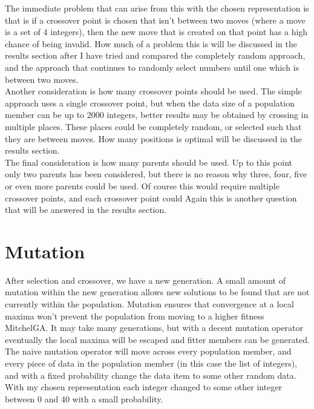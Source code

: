 \documentclass[]{report}
\begin{document}
The immediate problem that can arise from this with the chosen representation is that is if a crossover point is chosen that isn't between two moves (where a move is a set of 4 integers), then the new move that is created on that point has a high chance of being invalid. How much of a problem this is will be discussed in the results section after I have tried and compared the completely random approach, and the approach that continues to randomly select numbers until one which is between two moves. \\

Another consideration is how many crossover points should be used. The simple approach uses a single crossover point, but when the data size of a population member can be up to 2000 integers, better results may be obtained by crossing in multiple places. These places could be completely random, or selected such that they are between moves. How many positions is optimal will be discussed in the results section. \\

The final consideration is how many parents should be used. Up to this point only two parents has been considered, but there is no reason why three, four, five or even more parents could be used. Of course this would require multiple crossover points, and each crossover point could  Again this is another question that will be answered in the results section.

\section{Mutation}

After selection and crossover, we have a new generation. A small amount of mutation within the new generation allows new solutions to be found that are not currently within the population. Mutation ensures that convergence at a local maxima won't prevent the population from moving to a higher fitness {MitchelGA}. It may take many generations, but with a decent mutation operator eventually the local maxima will be escaped and fitter members can be generated.\\

The naive mutation operator will move across every population member, and every piece of data in the population member (in this case the list of integers), and with a fixed probability change the data item to some other random data. With my chosen representation each integer changed to some other integer between 0 and 40 with a small probability.\\
\end{document}
